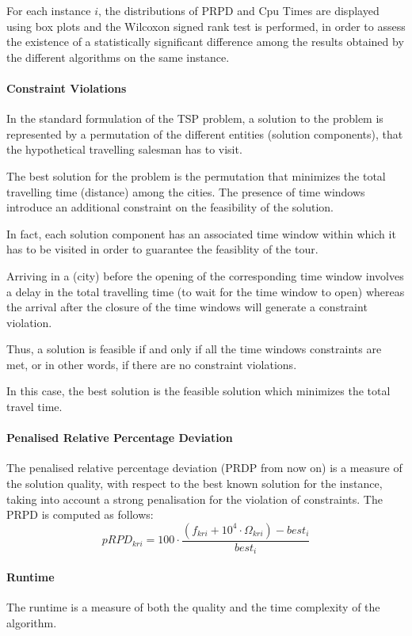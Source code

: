 \begin{homeworkProblem}
For each instance $i$, the distributions of PRPD and Cpu Times are displayed using box plots and the Wilcoxon signed rank test is performed, in order to assess the existence of a statistically significant difference among the results obtained by the different algorithms on the same instance. 

\paragraph{Constraint Violations}
In the standard formulation of the TSP problem, a solution to the problem is represented by a permutation of the different
entities (solution components), that the hypothetical travelling salesman has to visit.

The best solution for the problem is the permutation that minimizes the total travelling time (distance) among the cities.
The presence of time windows introduce an additional constraint on the feasibility of the solution.

In fact, each solution component has an associated time window within which it has to be visited in order to guarantee the feasiblity of the tour.

Arriving in a (city) before the opening of the corresponding time window involves a delay in the total travelling time (to wait for the time window to open) whereas the arrival after the closure of the time windows will generate a constraint violation.

Thus, a solution is feasible if and only if all the time windows constraints are met, or in other words, if there are no constraint violations.

In this case, the best solution is the feasible solution which minimizes the total travel time.

\paragraph{Penalised Relative Percentage Deviation}
The penalised relative percentage deviation (PRDP from now on) is a measure of the solution quality, with respect to the best known
solution for the instance, taking into account a strong penalisation for the violation of constraints.
The PRPD is computed as follows:
\begin{equation}
pRPD_{kri} = 100 \cdot \frac{(f_{kri} + 10^4\cdot\Omega_{kri})-best_i}{best_i}
\end{equation}

\paragraph{Runtime}
The runtime is a measure of both the quality and the time complexity of the algorithm.


\end{homeworkProblem}
